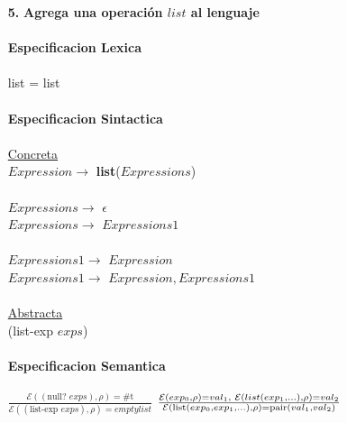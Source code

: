 \documentclass{article}
\begin{document}
\begin{itemize}
    \\
    \newpage
    \item[\textbf{5.}] \textbf{{\Large Agrega una operación $list$ al lenguaje}}\\
    \\
    \textbf{Especificacion Lexica}\\
    \\
    \hspace*{10mm} list = list\\
    \\
    \textbf{Especificacion Sintactica}\\
    \\
    \hspace*{10mm} \underline{Concreta}\\
    \hspace*{10mm} $Expression\rightarrow$ \textbf{list}($Expressions$)\\
    \\
    \hspace*{10mm} $Expressions\rightarrow$ $\epsilon$\\
    \hspace*{10mm} $Expressions\rightarrow$ $Expressions1$\\
    \\
    \hspace*{10mm} $Expressions1\rightarrow$ $Expression$\\
    \hspace*{10mm} $Expressions1\rightarrow$ $Expression,Expressions1$\\
    \\
    \hspace*{10mm} \underline{Abstracta}\\
    \hspace*{10mm} (list-exp $exps$)\\
    \\
    \textbf{Especificacion Semantica}\\
    \\
    \hspace*{10mm}
        $\frac
        {\mathcal{E}((\text{null? }exps),\rho)=\text{\#t}}
        {\mathcal{E}((\text{list-exp }exps),\rho)=emptylist}$
        \hspace*{10mm}
        $\frac
        {\mathcal{E}(exp_0,\rho)=val_1,\hspace{1mm}\mathcal{E}(list(exp_1,...),\rho)=val_2}
        {\mathcal{E}(\text{list}(exp_0,exp_1,...),\rho)=\text{pair}(val_1,val_2)}$\\

\end{itemize}
\end{document}
